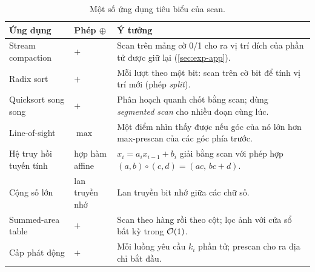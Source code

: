 \begin{table}[H]
\centering
\caption{Một số ứng dụng tiêu biểu của scan.}
\label{tab:apps}
\renewcommand{\arraystretch}{1.2}
\begin{tabularx}{\textwidth}{>{\raggedright\arraybackslash}p{3.5cm}>{\centering\arraybackslash}p{1.9cm}X}
\toprule
\textbf{Ứng dụng} & \textbf{Phép \(\oplus\)} & \textbf{Ý tưởng} \\
\midrule
Stream compaction & \(+\) & Scan trên mảng cờ 0/1 cho ra vị trí đích của phần tử được giữ lại
(\cref{sec:exp-app}). \\
Radix sort & \(+\) & Mỗi lượt theo một bit: scan trên cờ bit để tính vị trí mới (phép
\emph{split}). \\
Quicksort song song & \(+\) & Phân hoạch quanh chốt bằng scan; dùng \emph{segmented scan} cho
nhiều đoạn cùng lúc. \\
Line-of-sight & \(\max\) & Một điểm nhìn thấy được nếu góc của nó lớn hơn max-prescan của các góc
phía trước. \\
Hệ truy hồi tuyến tính & hợp hàm affine & \(x_i = a_i x_{i-1} + b_i\) giải bằng scan với phép
hợp \((a,b)\circ(c,d) = (ac,\, bc + d)\). \\
Cộng số lớn & lan truyền nhớ & Lan truyền bit nhớ giữa các chữ số. \\
Summed-area table & \(+\) & Scan theo hàng rồi theo cột; lọc ảnh với cửa sổ bất kỳ trong
\(\mathcal{O}(1)\). \\
Cấp phát động & \(+\) & Mỗi luồng yêu cầu \(k_i\) phần tử; prescan cho ra địa chỉ bắt đầu. \\
\bottomrule
\end{tabularx}
\end{table}
